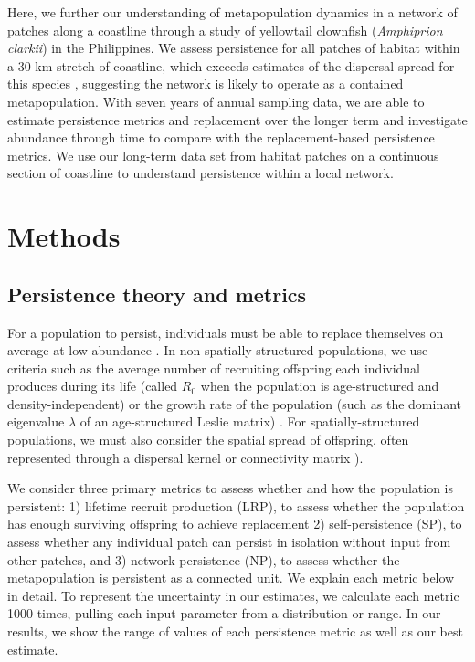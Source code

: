 \documentclass[12pt, oneside]{article}   	%
\begin{document}
Here, we further our understanding of metapopulation dynamics in a network of patches along a coastline through a study of yellowtail clownfish (\textit{Amphiprion clarkii}) in the Philippines. We assess persistence for all patches of habitat within a 30 km stretch of coastline, which exceeds estimates of the dispersal spread for this species \citep{pinsky2010using}, suggesting the network is likely to operate as a contained metapopulation. With seven years of annual sampling data, we are able to estimate persistence metrics and replacement over the longer term and investigate abundance through time to compare with the replacement-based persistence metrics. We use our long-term data set from habitat patches on a continuous section of coastline to understand persistence within a local network. %

\section*{Methods} 

\subsection*{Persistence theory and metrics}

For a population to persist, individuals must be able to replace themselves on average at low abundance \citep[e.g.][]{hastings_persistence_2006,botsford_connectivity_2009}. In non-spatially structured populations, we use criteria such as the average number of recruiting offspring each individual produces during its life (called $R_0$ when the population is age-structured and density-independent) or the growth rate of the population (such as the dominant eigenvalue $\lambda$ of an age-structured Leslie matrix) \citep{caswell_matrix_2001, burgess2014beyond}. For spatially-structured populations, we must also consider the spatial spread of offspring, often represented through a dispersal kernel or connectivity matrix \citep[e.g.][]{cowen_scaling_2006, buston2011probability, hogan_local_2011, daloia2015patterns}). 

We consider three primary metrics to assess whether and how the population is persistent: 1) lifetime recruit production (LRP), to assess whether the population has enough surviving offspring to achieve replacement 2) self-persistence (SP), to assess whether any individual patch can persist in isolation without input from other patches, and 3) network persistence (NP), to assess whether the metapopulation is persistent as a connected unit. We explain each metric below in detail. To represent the uncertainty in our estimates, we calculate each metric 1000 times, pulling each input parameter from a distribution or range. In our results, we show the range of values of each persistence metric as well as our best estimate. %
\end{document}
